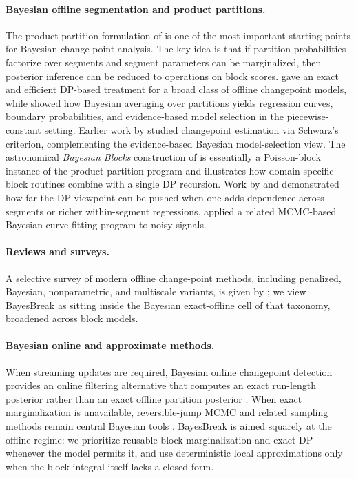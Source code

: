\paragraph{Bayesian offline segmentation and product partitions.}
The product-partition formulation of \citet{barry1992ppm, barry1993bayesCP} is one of the most
important starting points for Bayesian change-point analysis. The key idea is that if partition
probabilities factorize over segments and segment parameters can be marginalized, then posterior
inference can be reduced to operations on block scores. \citet{fearnhead2006exact} gave an exact
and efficient DP-based treatment for a broad class of offline changepoint models, while
\citet{hutter2006bpcr} showed how Bayesian averaging over partitions yields regression curves,
boundary probabilities, and evidence-based model selection in the piecewise-constant setting.
Earlier work by \citet{yao1988biometrika} studied changepoint estimation via Schwarz's criterion,
complementing the evidence-based Bayesian model-selection view. The astronomical \emph{Bayesian
Blocks} construction of \citet{scargle2013bayesianblocks} is essentially a Poisson-block instance
of the product-partition program and illustrates how domain-specific block routines combine with a
single DP recursion. Work by \citet{fearnhead2011dependence} and \citet{ruggieri2014bcpvs}
demonstrated how far the DP viewpoint can be pushed when one adds dependence across segments or
richer within-segment regressions. \citet{punskaya2002bayesian} applied a related MCMC-based
Bayesian curve-fitting program to noisy signals.

\paragraph{Reviews and surveys.}
A selective survey of modern offline change-point methods, including penalized, Bayesian,
nonparametric, and multiscale variants, is given by \citet{truong2020review}; we view BayesBreak
as sitting inside the Bayesian exact-offline cell of that taxonomy, broadened across block models.

\paragraph{Bayesian online and approximate methods.}
When streaming updates are required, Bayesian online changepoint detection provides an online
filtering alternative that computes an exact run-length posterior rather than an exact offline
partition posterior \citep{adamsmackay2007bocpd}. When exact
marginalization is unavailable, reversible-jump MCMC and related sampling methods remain central
Bayesian tools \citep{green1995rjMCMC, denison1998bayesian}. BayesBreak is aimed squarely at the
offline regime: we prioritize reusable block marginalization and exact DP whenever the model
permits it, and use deterministic local approximations only when the block integral itself lacks a
closed form.

